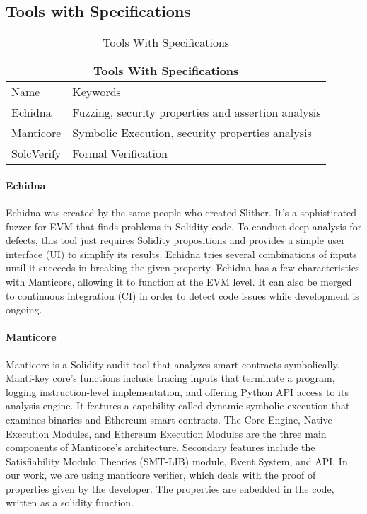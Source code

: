 \documentclass[a4paper,sigconf, language=french,
language=german, language=spanish, language=english]{acmart}
\begin{document}
\subsection {Tools with Specifications}

\begin{table*}
  \caption{Tools With Specifications}
  \label{TollsWithSpec}
  \begin{tabular}{ |p{5cm}|p{5cm}|  }
    \hline
    \multicolumn{2}{|c|}{Tools With Specifications }\\
    \hline
    Name & Keywords \\
    \hline 
    Echidna  & Fuzzing, security properties and assertion analysis\\
    \hline
    Manticore  & Symbolic Execution, security properties analysis \\
    \hline
    SolcVerify & Formal Verification 
  \end{tabular}
\end{table*}
\paragraph{Echidna} Echidna was created by the same people who created Slither.
It's a sophisticated fuzzer for EVM that finds problems in Solidity code.
To conduct deep analysis for defects, this tool just requires Solidity propositions and provides a simple user interface (UI) to simplify its results.
Echidna tries several combinations of inputs until it succeeds in breaking the given property.
Echidna has a few characteristics with Manticore, allowing it to function at the EVM level.
It can also be merged to continuous integration (CI) in order to detect code issues while development is ongoing. 

\paragraph{Manticore} Manticore is a Solidity audit tool that analyzes smart contracts symbolically.
Manti-key core's functions include tracing inputs that terminate a program, logging instruction-level implementation, and offering Python API access to its analysis engine.
It features a capability called dynamic symbolic execution that examines binaries and Ethereum smart contracts.
The Core Engine, Native Execution Modules, and Ethereum Execution Modules are the three main components of Manticore's architecture.
Secondary features include the Satisfiability Modulo Theories (SMT-LIB) module, Event System, and API. 
In our work, we are using manticore verifier, which deals with the proof of properties given by the developer. 
The properties are enbedded in the code, written as a solidity function.
\end{document}
